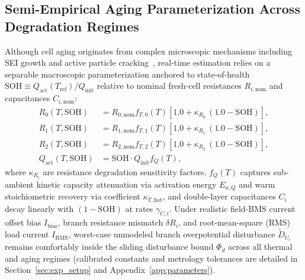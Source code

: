 \documentclass[11pt,a4paper]{article}
\begin{document}
\subsection{Semi-Empirical Aging Parameterization Across Degradation Regimes}
Although cell aging originates from complex microscopic mechanisms including SEI growth and active particle cracking~\cite{Birkl2017diagnostics,Ren2019aging}, real-time estimation relies on a separable macroscopic parameterization anchored to state-of-health $\text{SOH} \equiv Q_{\text{act}}(T_{\text{ref}})/Q_{\text{init}}$ relative to nominal fresh-cell resistances $R_{i,\text{nom}}$ and capacitances $C_{i,\text{nom}}$:
\begin{align}
R_0(T, \text{SOH}) &= R_{0,\text{nom}} f_{T,0}(T) [1.0 + \kappa_{R_0}\,(1.0 - \text{SOH})], \label{eqn:aging_r0}\\
R_1(T, \text{SOH}) &= R_{1,\text{nom}} f_{T,1}(T) [1.0 + \kappa_{R_1}\,(1.0 - \text{SOH})], \label{eqn:aging_r1}\\
R_2(T, \text{SOH}) &= R_{2,\text{nom}} f_{T,2}(T) [1.0 + \kappa_{R_2}\,(1.0 - \text{SOH})], \label{eqn:aging_r2}\\
Q_{\text{act}}(T, \text{SOH}) &= \text{SOH} \cdot Q_{\text{init}} f_Q(T), \label{eqn:aging_q}
\end{align}
where $\kappa_{R_i}$ are resistance degradation sensitivity factors, $f_Q(T)$ captures sub-ambient kinetic capacity attenuation via activation energy $E_{a,Q}$ and warm stoichiometric recovery via coefficient $\kappa_{T,\text{hot}}$, and double-layer capacitances $C_i$ decay linearly with $(1-\text{SOH})$ at rates $\gamma_{C,i}$. Under realistic field-BMS current offset bias $I_{\text{bias}}$, branch resistance mismatch $\delta R_i$, and root-mean-square (RMS) load current $I_{\text{RMS}}$, worst-case unmodeled branch overpotential disturbance $\tilde{D}_{U_i}$ remains comfortably inside the sliding disturbance bound $\Phi_d$ across all thermal and aging regimes (calibrated constants and metrology tolerances are detailed in Section~\ref{sec:exp_setup} and Appendix~\ref{app:parameters}).
\end{document}
